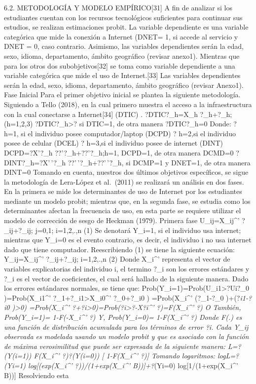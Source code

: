 6.2. METODOLOGÍA Y MODELO EMPÍRICO{[}31{]} A fin de analizar si los
estudiantes cuentan con los recursos tecnológicos suficientes para
continuar sus estudios, se realizan estimaciones probit. La variable
dependiente es una variable categórica que mide la conexión a Internet
(DNET= 1, si accede al servicio y DNET = 0, caso contrario. Asimismo,
las variables dependientes serán la edad, sexo, idioma, departamento,
ámbito geográfico (revisar anexo1). Mientras que para los otros dos
subobjetivos{[}32{]} se toma como variable dependiente a una variable
categórica que mide el uso de Internet.{[}33{]} Las variables
dependientes serán la edad, sexo, idioma, departamento, ámbito
geográfico (revisar Anexo1). Fase Inicial Para el primer objetivo
inicial se plantea la siguiente metodología. Siguiendo a Tello (2018),
en la cual primero muestra el acceso a la infraestructura con la cual
conectarse a Internet{[}34{]} (DTIC) . ?DTIC?\_h=X\_h
?\_h+?\_h;(h=1,2,3) ?DTIC?\_h\textgreater? si DTIC=1, de otra manera
?DTIC?\_h=0 Donde: ? h=1, si el individuo posee computador/laptop (DCPD)
? h=2,si el individuo posee de celular (DCEL) ? h=3,si el individuo
posee de internet (DINT) DCPD=?X'?\_h ??'?\_h+??'?\_h;h=1, DCPD=1, de
otra manera DCMD=0 ?DINT?\_h=?X'\,'?\_h ??'\,'?\_h+??'\,'?\_h, si DCMP=1
y DNET=1, de otra manera DINT=0 Tomando en cuenta, nuestros dos últimos
objetivos específicos, se sigue la metodología de Lera-López et
al.~(2011) se realizará un análisis en dos fases. En la primera se mide
los determinantes de uso de Internet por los estudiantes mediante un
modelo probit; mientras que, en la segunda fase, se estudia como los
determinantes afectan la frecuencia de uso, en esta parte se requiere
utilizar el modelo de corrección de sesgo de Heckman (1979). Primera
fase U\_ij=X\_ij\^{}' ?\_ij+?\_ij; j=0,1; i=1,2,.,n (1) Se denotará
Y\_i=1, si el individuo usa internet; mientras que Y\_i=0 es el evento
contrario, es decir, el individuo i no usa internet dado que tiene
computador. Reescribiendo (1) se tiene la siguiente ecuación:
Y\_ij=X\_ij\^{}' ?\_ij+?\_ij; i=1,2,.,n (2) Donde X\_i\^{}' representa
el vector de variables explicatorias del individuo i, el termino ?\_i
son los errores estándares y ?\_i es el vector de coeficientes, el cual
será hallado de la siguiente manera. Dado los errores estándares
normales, se tiene que: Prob(Y\_i=1)=Prob(U\_i1\textgreater?Ui?\_0
)=Prob(X\_i1\^{}' ?\_1+?\_i1\textgreater X\_i0\^{}' ?\_0+?\_i0 )
=Prob(X\_i\^{}' (?\_1-?\_0 )+(?\emph{i1-?\emph{i0 )\textgreater0)
=Prob(X\_i\^{}'
?+?\emph{i\textgreater0)=Prob(?\emph{i\textgreater?-X?\emph{i\^{}'
?)=F(X\_i\^{}' ?) O También, Prob(Y\_i=1)= 1-F(-X\_i\^{}' ?) Y,
Prob(Y\_i=0)= 1-F(X\_i\^{}' ?) Donde F(.) es una función de distribución
acumulada para los términos de error ?\emph{i. Cada Y\_ij observada es
modelada usando un modelo probit y que es asociado con la función de
máxima verosimilitud que puede ser expresada de la siguiente manera:
L=?}(Y}(i=1)) F(X\_i\^{}' ?)?}(Y}(i=0)) {[} 1-F(X\_i\^{}' ?){]} Tomando
logaritmos: logL=?}(Yi=1) log{[}(exp(X\_i\^{}' ?))/(1+exp(X\_i\^{}'
B)){]}+?}(Yi=0) log{[}1/(1+exp(X\_i\^{}' B)){]} Resolviendo esta
